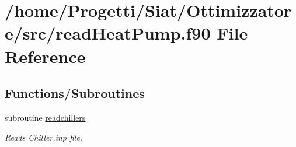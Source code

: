 \hypertarget{read_heat_pump_8f90}{\section{/home/\-Progetti/\-Siat/\-Ottimizzatore/src/read\-Heat\-Pump.f90 File Reference}
\label{read_heat_pump_8f90}
}
\subsection*{Functions/\-Subroutines}
\begin{DoxyCompactItemize}
\item 
subroutine \hyperlink{read_heat_pump_8f90_a3c06bf38f25f8177df77cbf0c1cfd834}{readchillers}
\begin{DoxyCompactList}\small\item\em Reads Chiller.\-inp file. \end{DoxyCompactList}\end{DoxyCompactItemize}


